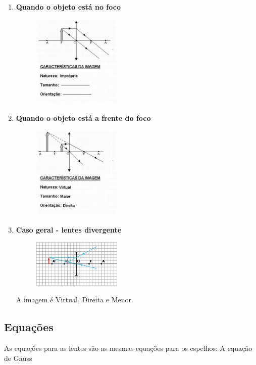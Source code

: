 \documentclass[12pt]{extarticle}
\newcommand{\<}{\langle}
\renewcommand{\>}{\rangle}
\theoremstyle{definition}
\begin{document}
\begin{enumerate}
    \item \textbf{Quando o objeto está no foco}
    \begin{figure}[H]
        \centering
        \includegraphics[width=0.4\textwidth]{caso_conv_no_foco.jpg}
    \end{figure}
    
    \item \textbf{Quando o objeto está a frente do foco}
    \begin{figure}[H]
        \centering
        \includegraphics[width=0.4\textwidth]{caso_conv_frente_foco.jpg}
    \end{figure}
    
    \item \textbf{Caso geral - lentes divergente}
    \begin{figure}[H]
        \centering
        \includegraphics[width=0.4\textwidth]{caso_div.png}
    \end{figure}
    A imagem é Virtual, Direita e Menor.
\end{enumerate}

\subsection{Equações}
As equações para as lentes são as mesmas equações para os espelhos: A equação de Gauss
\end{document}
